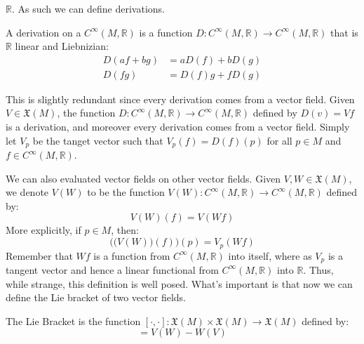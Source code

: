         $\mathbb{R}$. As such we can define derivations.
        \begin{definition}
            A derivation on a $C^{\infty}(M,\mathbb{R})$ is a function
            $D:C^{\infty}(M,\mathbb{R})\rightarrow{C}^{\infty}(M,\mathbb{R})$
            that is $\mathbb{R}$ linear and Liebnizian:
            \begin{align}
                D(af+bg)&=aD(f)+bD(g)\\
                D(fg)&=D(f)g+fD(g)
            \end{align}
        \end{definition}
        This is slightly redundant since every derivation comes from a vector
        field. Given $V\in\mathfrak{X}(M)$, the function
        $D:C^{\infty}(M,\mathbb{R})\rightarrow{C}^{\infty}(M,\mathbb{R})$
        defined by $D(v)=Vf$ is a derivation, and moreover every derivation
        comes from a vector field. Simply let $V_{p}$ be the tanget vector such
        that $V_{p}(f)=D(f)(p)$ for all $p\in{M}$ and
        $f\in{C}^{\infty}(M,\mathbb{R})$.
        \par\hfill\par
        We can also evaluated vector fields on other vector fields. Given
        $V,W\in\mathfrak{X}(M)$, we denote $V(W)$ to be the function
        $V(W):C^{\infty}(M,\mathbb{R})\rightarrow{C}^{\infty}(M,\mathbb{R})$
        defined by:
        \begin{equation}
            V(W)(f)=V(Wf)
        \end{equation}
        More explicitly, if $p\in{M}$, then:
        \begin{equation}
            \Big(\big(V(W)\big)(f)\Big)(p)=V_{p}(Wf)
        \end{equation}
        Remember that $Wf$ is a function from $C^{\infty}(M,\mathbb{R})$ into
        itself, where as $V_{p}$ is a tangent vector and hence a linear
        functional from $C^{\infty}(M,\mathbb{R})$ into $\mathbb{R}$. Thus,
        while strange, this definition is well posed. What's important is that
        now we can define the Lie bracket of two vector fields.
        \begin{definition}
            The Lie Bracket is the function
            $[\cdot,\cdot]:\mathfrak{X}(M)\times\mathfrak{X}(M)%
             \rightarrow\mathfrak{X}(M)$ defined by:
            \begin{equation}
                [V,W]=V(W)-W(V)
            \end{equation}
        \end{definition}
